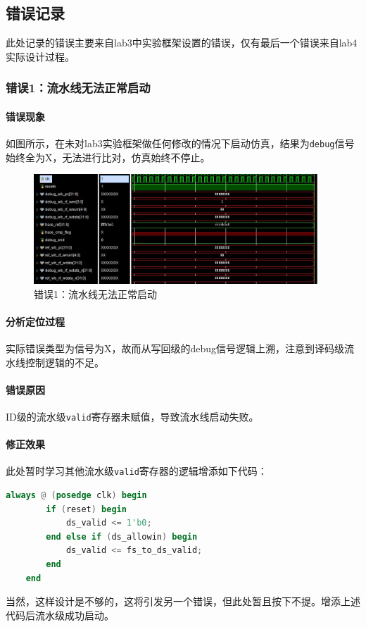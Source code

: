 \documentclass[UTF-8,twoside,c5size]{ctexart}
\begin{document}
	\subsection{错误记录}
	
	此处记录的错误主要来自lab3中实验框架设置的错误，仅有最后一个错误来自lab4实际设计过程。
	
	\subsubsection{错误\textbf{1：}流水线无法正常启动}
	\paragraph{错误现象}\hfill
	
	如图所示，在未对lab3实验框架做任何修改的情况下启动仿真，结果为\texttt{debug}信号始终全为X，无法进行比对，仿真始终不停止。
	\begin{figure}[!h]
		\centering
		\includegraphics*[width=0.95\textwidth]{03-dbg-01.jpg}
		\caption{错误1：流水线无法正常启动}
	\end{figure}
	\paragraph{分析定位过程}\hfill
	
	实际错误类型为信号为X，故而从写回级的debug信号逻辑上溯，注意到译码级流水线控制逻辑的不足。
	
	\paragraph{错误原因}\hfill
	
	ID级的流水级\texttt{valid}寄存器未赋值，导致流水线启动失败。
	
	\paragraph{修正效果}\hfill
	
	此处暂时学习其他流水级\texttt{valid}寄存器的逻辑增添如下代码：
	\begin{lstlisting}[language=verilog]
	always @ (posedge clk) begin
		if (reset) begin
			ds_valid <= 1'b0;
		end else if (ds_allowin) begin
			ds_valid <= fs_to_ds_valid;
		end
	end
	\end{lstlisting}
	当然，这样设计是不够的，这将引发另一个错误，但此处暂且按下不提。增添上述代码后流水级成功启动。
	
\end{document}
